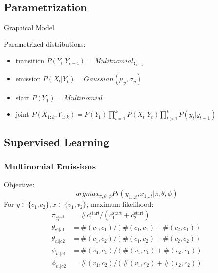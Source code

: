 \documentclass[]{article}
\theoremstyle{definition}
\begin{document}
\subsection{Parametrization}
\label{sub:parametrization}
Graphical Model \\

Parametrized distributions:
\begin{itemize}
    \item transition $P(Y_t|Y_{t-1}) = Mulitnomial_{Y_{t-1}}$
    \item emission $P(X_t | Y_t) = Gaussian(\mu_y, \sigma_y)$
    \item start $P(Y_1) = Multinomial$ 
    \item joint $P(X_{1:k}, Y_{1:k}) = P(Y_1) \prod_{t=1}^{k} P(X_t | Y_t) \prod_{t > 1}^k P(y_t | y_{t-1})$
\end{itemize}

\subsection{Supervised Learning}
\label{sub:supervised_learning}

\subsubsection{Multinomial Emissions}
\label{ssub:Multinomial Emissions}

Objective:
\begin{equation*}
    argmax_{\pi, \theta, \phi} Pr(y_{1 \ldots t}, x_{1 \ldots t} | \pi, \theta, \phi)
\end{equation*}
For $y \in \{c_1, c_2\}, x \in \{v_1, v_2\}$, maximum likelihood:
\begin{align*}
    \pi_{c_1^{\text{start}}} &= \# c_1^{\text{start}} / (c_1^{\text{start}} + c_2^{\text{start}}) \\
    \theta_{c1|c1} &= \#(c_1, c_1) / (\#(c_1, c_1) + \#(c_2, c_1)) \\
    \theta_{c1|c2} &= \#(c_1, c_2) / (\#(c_1, c_2) + \#(c_2, c_2)) \\
    \phi_{v1|c1} &= \#(v_1, c_1) / (\#(v_1, c_1) + \#(v_2, c_1)) \\
    \phi_{v1|c2} &= \#(v_1, c_2) / (\#(v_1, c_2) + \#(v_2, c_2)) \\
\end{align*}
\end{document}
